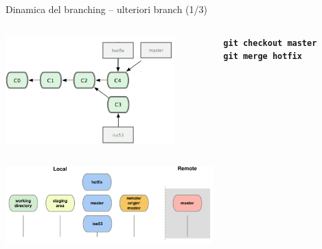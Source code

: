 \documentclass{beamer}
\begin{document}
\begin{frame}{\centerline{Dinamica del branching -- ulteriori branch (1/3)}}
  \begin{columns}
    \begin{column}{0.6\linewidth}
      \begin{center}
        \includegraphics[width=6.5cm]{A2023.LavoroCondiviso/18333fig0314c-tn}
      \end{center}
    \end{column}
    \begin{column}{0.45\linewidth}
      \begin{center}
        \texttt{\textbf{git checkout master}}\\
        \texttt{\textbf{git merge hotfix}}\\
      \end{center}
    \end{column}
  \end{columns}
  \begin{center}
    \includegraphics[width=8cm]{A2023.LavoroCondiviso/git-branch2}
  \end{center}
\end{frame}
\end{document}
